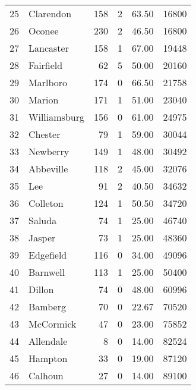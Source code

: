 \begin{tabular}{llrrrr}
25 &     Clarendon &   158 &      2 &  63.50 &         16800 \\
26 &        Oconee &   230 &      2 &  46.50 &         16800 \\
27 &     Lancaster &   158 &      1 &  67.00 &         19448 \\
28 &     Fairfield &    62 &      5 &  50.00 &         20160 \\
29 &      Marlboro &   174 &      0 &  66.50 &         21758 \\
30 &        Marion &   171 &      1 &  51.00 &         23040 \\
31 &  Williamsburg &   156 &      0 &  61.00 &         24975 \\
32 &       Chester &    79 &      1 &  59.00 &         30044 \\
33 &      Newberry &   149 &      1 &  48.00 &         30492 \\
34 &     Abbeville &   118 &      2 &  45.00 &         32076 \\
35 &           Lee &    91 &      2 &  40.50 &         34632 \\
36 &      Colleton &   124 &      1 &  50.50 &         34720 \\
37 &        Saluda &    74 &      1 &  25.00 &         46740 \\
38 &        Jasper &    73 &      1 &  25.00 &         48360 \\
39 &     Edgefield &   116 &      0 &  34.00 &         49096 \\
40 &      Barnwell &   113 &      1 &  25.00 &         50400 \\
41 &        Dillon &    74 &      0 &  48.00 &         60996 \\
42 &       Bamberg &    70 &      0 &  22.67 &         70520 \\
43 &     McCormick &    47 &      0 &  23.00 &         75852 \\
44 &     Allendale &     8 &      0 &  14.00 &         82524 \\
45 &       Hampton &    33 &      0 &  19.00 &         87120 \\
46 &       Calhoun &    27 &      0 &  14.00 &         89100 \\
\bottomrule
\end{tabular}
